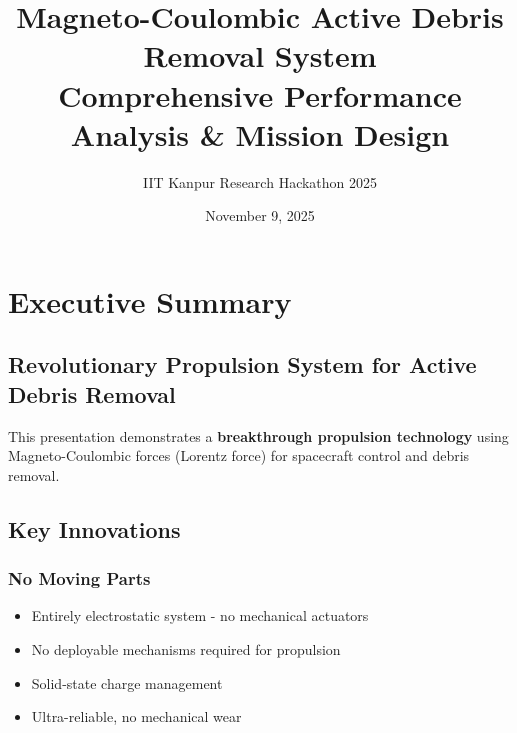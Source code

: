 \documentclass[11pt,a4paper]{article}
\title{\textbf{\Huge Magneto-Coulombic Active Debris Removal System}\\
\vspace{0.5cm}
\Large Comprehensive Performance Analysis \& Mission Design}
\author{IIT Kanpur Research Hackathon 2025}
\date{November 9, 2025}
\begin{document}
\maketitle
\thispagestyle{empty}

\vspace{1cm}

\begin{center}
\end{center}

\newpage
\tableofcontents
\newpage

\section{Executive Summary}

\subsection{Revolutionary Propulsion System for Active Debris Removal}

This presentation demonstrates a \textbf{breakthrough propulsion technology} using Magneto-Coulombic forces (Lorentz force) for spacecraft control and debris removal.

\subsection{Key Innovations}

\subsubsection{No Moving Parts}
\begin{itemize}[leftmargin=*]
    \item Entirely electrostatic system - no mechanical actuators
    \item No deployable mechanisms required for propulsion
    \item Solid-state charge management
    \item Ultra-reliable, no mechanical wear
\end{itemize}
\end{document}
